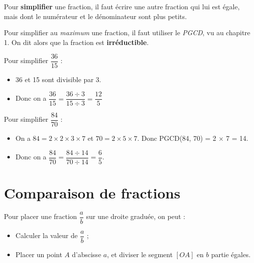 \documentclass[../€Cours-complet/Cours-complet]{subfiles}
\begin{document}
\begin{cours}
	Pour \textbf{simplifier} une fraction, il faut écrire une autre fraction qui lui est égale, mais dont le numérateur et le dénominateur sont plus petits.

	Pour simplifier au \textit{maximum} une fraction, il faut utiliser le \textit{PGCD}, vu au chapitre 1. On dit alors que la fraction est \textbf{irréductible}.
\end{cours}

\begin{exemple}
	Pour simplifier $\dfrac{36}{15}$ :
	\begin{itemize}
		\item 36 et 15 sont divisible par 3.
		\item Donc on a $\dfrac{36}{15} = \dfrac{36 ÷ 3}{15 ÷ 3} = \dfrac{12}{5}$
	\end{itemize}
\end{exemple}

\begin{exemple}
	Pour simplifier $\dfrac{84}{70}$ :
	\begin{itemize}
		\item On a $84 = 2 × 2 × 3 × 7$ et $70 = 2 × 5 × 7$. Donc PGCD(84, 70) = 2 × 7 = 14.
		\item Donc on a $\dfrac{84}{70} = \dfrac{84 ÷ 14}{70 ÷ 14} = \dfrac{6}{5}$.
	\end{itemize}
\end{exemple}

\section{Comparaison de fractions}

\begin{cours}
	Pour placer une fraction $\dfrac{a}{b}$ sur une droite graduée, on peut :
	\begin{itemize}
		\item Calculer la valeur de $\dfrac{a}{b}$ ;
		\item Placer un point $A$ d'abscisse $a$, et diviser le segment $[OA]$ en $b$ partie égales.
	\end{itemize}
\end{cours}
\end{document}
